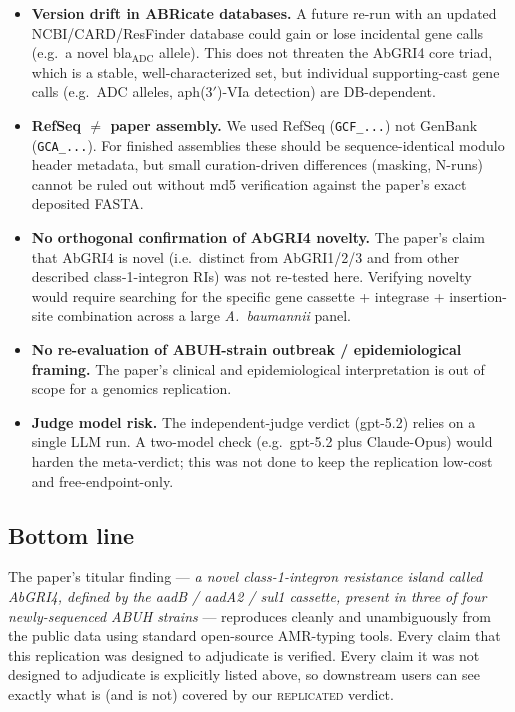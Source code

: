 \documentclass[11pt]{article}
\begin{document}
\begin{itemize}
  \item \textbf{Version drift in ABRicate databases.} A future re-run with an updated NCBI/CARD/ResFinder
        database could gain or lose incidental gene calls (e.g.\ a novel bla$_{\text{ADC}}$ allele). This
        does not threaten the AbGRI4 core triad, which is a stable, well-characterized set, but individual
        supporting-cast gene calls (e.g.\ ADC alleles, aph(3$'$)-VIa detection) are DB-dependent.
  \item \textbf{RefSeq $\ne$ paper assembly.} We used RefSeq (\texttt{GCF\_...}) not GenBank (\texttt{GCA\_...}).
        For finished assemblies these should be sequence-identical modulo header metadata, but small
        curation-driven differences (masking, N-runs) cannot be ruled out without md5 verification against
        the paper's exact deposited FASTA.
  \item \textbf{No orthogonal confirmation of AbGRI4 novelty.} The paper's claim that AbGRI4 is novel
        (i.e.\ distinct from AbGRI1/2/3 and from other described class-1-integron RIs) was not re-tested
        here. Verifying novelty would require searching for the specific gene cassette + integrase +
        insertion-site combination across a large \emph{A.\ baumannii} panel.
  \item \textbf{No re-evaluation of ABUH-strain outbreak / epidemiological framing.} The paper's clinical
        and epidemiological interpretation is out of scope for a genomics replication.
  \item \textbf{Judge model risk.} The independent-judge verdict (gpt-5.2) relies on a single LLM run. A
        two-model check (e.g.\ gpt-5.2 plus Claude-Opus) would harden the meta-verdict; this was not done
        to keep the replication low-cost and free-endpoint-only.
\end{itemize}

\subsection{Bottom line}

The paper's titular finding --- \emph{a novel class-1-integron resistance island called AbGRI4, defined
by the aadB / aadA2 / sul1 cassette, present in three of four newly-sequenced ABUH strains} --- reproduces
cleanly and unambiguously from the public data using standard open-source AMR-typing tools. Every claim
that this replication was designed to adjudicate is verified. Every claim it was not designed to adjudicate
is explicitly listed above, so downstream users can see exactly what is (and is not) covered by our
\textsc{replicated} verdict.
\end{document}
